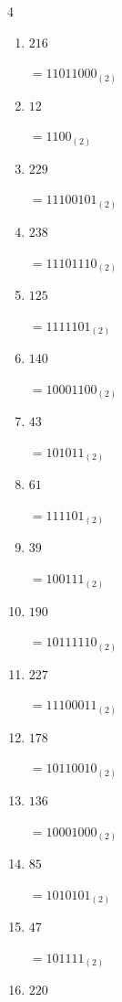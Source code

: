 \begin{multicols}{4}
\begin{enumerate}
        $=1101100_{(2)}$

\columnbreak %

  \item $216$

        $=11011000_{(2)}$

  \item $12$

        $=1100_{(2)}$

  \item $229$

        $=11100101_{(2)}$

  \item $238$

        $=11101110_{(2)}$

  \item $125$

        $=1111101_{(2)}$

  \item $140$

        $=10001100_{(2)}$

  \item $43$

        $=101011_{(2)}$

  \item $61$

        $=111101_{(2)}$

  \item $39$

        $=100111_{(2)}$

  \item $190$

        $=10111110_{(2)}$

  \item $227$

        $=11100011_{(2)}$

  \item $178$

        $=10110010_{(2)}$

  \item $136$

        $=10001000_{(2)}$

  \item $85$

        $=1010101_{(2)}$

  \item $47$

        $=101111_{(2)}$

\columnbreak %

  \item $220$


\end{enumerate}
\end{multicols}
